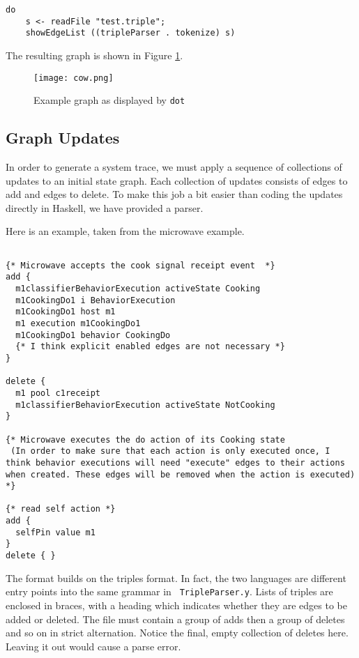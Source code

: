 \documentclass[a4paper]{article}
\begin{document}
\begin{verbatim}
do 
    s <- readFile "test.triple"; 
    showEdgeList ((tripleParser . tokenize) s)
\end{verbatim}
The resulting graph is shown in Figure \ref{cow}.


\begin{figure}
\begin{center}
\texttt{[image: cow.png]}
\end{center}
\caption{Example graph as displayed by {\tt dot}}
\label{cow}
\end{figure}

\subsection{Graph Updates}
In order to generate a system trace, we must apply a sequence of
collections of updates to an initial state graph.  Each collection of
updates consists of edges to add and edges to delete.  To make this
job a bit easier than coding the updates directly in Haskell, we have
provided a parser.  

Here is an example, taken from the microwave example.

\begin{verbatim}

{* Microwave accepts the cook signal receipt event  *}
add {
  m1classifierBehaviorExecution activeState Cooking
  m1CookingDo1 i BehaviorExecution
  m1CookingDo1 host m1     
  m1 execution m1CookingDo1
  m1CookingDo1 behavior CookingDo
  {* I think explicit enabled edges are not necessary *}
}

delete {
  m1 pool c1receipt
  m1classifierBehaviorExecution activeState NotCooking
}

{* Microwave executes the do action of its Cooking state
 (In order to make sure that each action is only executed once, I
think behavior executions will need "execute" edges to their actions
when created. These edges will be removed when the action is executed)
*}

{* read self action *}
add {
  selfPin value m1
}
delete { }
\end{verbatim}

The format builds on the triples format.  In fact, the two languages
are different entry points into the same grammar in {\tt
  TripleParser.y}. Lists of triples are enclosed in braces, with a
heading which indicates whether they are edges to be added or deleted.
The file must contain a group of adds then a group of deletes and so
on in strict alternation.  Notice the final, empty collection of
deletes here.  Leaving it out would cause a parse error.
\end{document}
